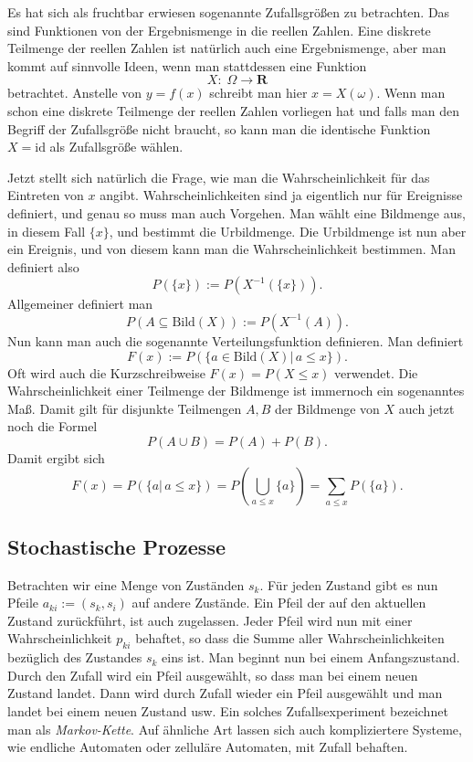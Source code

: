 \documentclass[a4paper,10pt,fleqn,twocolumn,twoside]{article}
\begin{document}
Es hat sich als fruchtbar erwiesen sogenannte Zufallsgrößen zu
betrachten. Das sind Funktionen von der Ergebnismenge in die reellen
Zahlen. Eine diskrete Teilmenge der reellen Zahlen ist natürlich auch
eine Ergebnismenge, aber man kommt auf sinnvolle Ideen, wenn man
stattdessen eine Funktion
\[X{:}\;\Omega\rightarrow\mathbf R\]
betrachtet. Anstelle von \(y=f(x)\) schreibt man hier \(x=X(\omega)\).
Wenn man schon eine diskrete Teilmenge der reellen Zahlen vorliegen
hat und falls man den Begriff der Zufallsgröße nicht braucht, so kann
man die identische Funktion \(X=\mathrm{id}\) als Zufallsgröße wählen.

Jetzt stellt sich natürlich die Frage, wie man die
Wahrscheinlichkeit für das Eintreten von \(x\) angibt.
Wahrscheinlichkeiten sind ja eigentlich nur für Ereignisse definiert,
und genau so muss man auch Vorgehen. Man wählt eine Bildmenge aus,
in diesem Fall \(\{x\}\), und bestimmt die Urbildmenge.
Die Urbildmenge ist nun aber ein Ereignis, und von diesem kann man
die Wahrscheinlichkeit bestimmen. Man definiert also
\[P(\{x\}) := P(X^{-1}(\{x\})).\]
Allgemeiner definiert man
\[P(A\subseteq \mathrm{Bild}(X)) := P(X^{-1}(A)).\]
Nun kann man auch die sogenannte Verteilungsfunktion definieren.
Man definiert
\[F(x) := P(\{a{\in}\mathrm{Bild}(X)|\,a\le x\}).\]
Oft wird auch die Kurzschreibweise \(F(x)=P(X\le x)\) verwendet.
Die Wahrscheinlichkeit einer Teilmenge der Bildmenge ist immernoch
ein sogenanntes Maß. Damit gilt für disjunkte Teilmengen \(A,B\)
der Bildmenge von \(X\) auch jetzt noch die Formel
\[P(A\cup B) = P(A)+P(B).\]
Damit ergibt sich
\[F(x) = P(\{a|\,a\le x\})
= P(\bigcup_{a\le x}\{a\}) = \sum_{a\le x} P(\{a\}).\]


\subsection{Stochastische Prozesse}
Betrachten wir eine Menge von Zuständen \(s_k\). Für jeden
Zustand gibt es nun Pfeile \(a_{ki}:=(s_k,s_i)\) auf andere Zustände.
Ein Pfeil der auf den aktuellen Zustand zurückführt, ist auch
zugelassen. Jeder Pfeil wird nun mit einer Wahrscheinlichkeit
\(p_{ki}\) behaftet, so dass die Summe aller Wahrscheinlichkeiten
bezüglich des Zustandes \(s_k\) eins ist. Man beginnt nun bei einem
Anfangszustand. Durch den Zufall wird ein Pfeil ausgewählt, so dass
man bei einem neuen Zustand landet. Dann wird durch Zufall wieder
ein Pfeil ausgewählt und man landet bei einem neuen Zustand usw.
Ein solches Zufallsexperiment bezeichnet man als
\textit{Markov-Kette}. Auf ähnliche Art lassen sich auch
kompliziertere Systeme, wie endliche Automaten oder zelluläre
Automaten, mit Zufall behaften.
\end{document}
